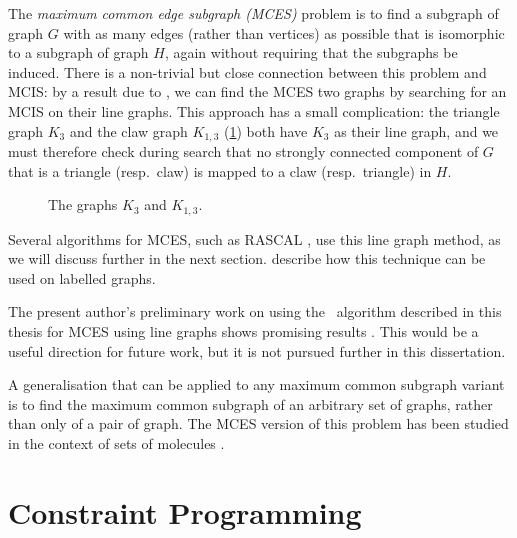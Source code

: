 The \emph{maximum common edge subgraph (MCES)} problem is to find a subgraph of
graph $G$ with as many edges (rather than vertices) as possible that is
isomorphic to a subgraph of graph $H$, again without requiring that the
subgraphs be induced.  There is a non-trivial but close connection between this
problem and MCIS: by a result due to \citet{whitney1932congruent}, we can find
the MCES two graphs by searching for an MCIS on their line graphs.  This
approach has a small complication: the triangle graph $K_3$ and the claw graph
$K_{1,3}$ (\cref{fig:k3-and-claw}) both have $K_3$ as their line graph, and we
must therefore check during search that no strongly connected component of $G$
that is a triangle (resp.\ claw) is mapped to a claw (resp.\ triangle) in $H$.

\begin{figure}[htb]
    \centering
    
    \caption{The graphs $K_3$ and $K_{1,3}$.}
    \label{fig:k3-and-claw}
\end{figure}

Several algorithms for MCES, such as RASCAL
\citep{DBLP:journals/cj/RaymondGW02}, use this line graph method, as we will discuss further
in the next section.  \citet{DBLP:conf/mco/VismaraV08} describe how this technique
can be used on labelled graphs.

The present author's preliminary work on using the \McSplit\ algorithm
described in this thesis for MCES using line graphs shows promising results
\citep{trimble2018three}. This would be a useful direction for future work, but
it is not pursued further in this dissertation.

A generalisation that can be applied to any maximum common subgraph
variant is to find the maximum common subgraph of an arbitrary set of graphs,
rather than only of a pair of graph.  The MCES version of this problem has
been studied in the context of sets of molecules
\citep{DBLP:journals/jcheminf/DalkeH13}.


\section{Constraint Programming}\label{sec:cp}

